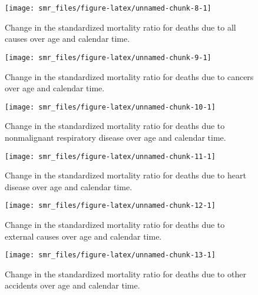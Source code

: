 \documentclass[]{article}
\begin{document}
\begin{figure}[H]

{\centering \texttt{[image: smr\_files/figure-latex/unnamed-chunk-8-1]} 

}

\caption{Change in the standardized mortality ratio for deaths due to all causes over age and calendar time.}\label{fig:unnamed-chunk-8}
\end{figure}

\begin{figure}[H]

{\centering \texttt{[image: smr\_files/figure-latex/unnamed-chunk-9-1]} 

}

\caption{Change in the standardized mortality ratio for deaths due to cancers over age and calendar time.}\label{fig:unnamed-chunk-9}
\end{figure}

\begin{figure}[H]

{\centering \texttt{[image: smr\_files/figure-latex/unnamed-chunk-10-1]} 

}

\caption{Change in the standardized mortality ratio for deaths due to nonmalignant respiratory disease over age and calendar time.}\label{fig:unnamed-chunk-10}
\end{figure}

\begin{figure}[H]

{\centering \texttt{[image: smr\_files/figure-latex/unnamed-chunk-11-1]} 

}

\caption{Change in the standardized mortality ratio for deaths due to heart disease over age and calendar time.}\label{fig:unnamed-chunk-11}
\end{figure}

\begin{figure}[H]

{\centering \texttt{[image: smr\_files/figure-latex/unnamed-chunk-12-1]} 

}

\caption{Change in the standardized mortality ratio for deaths due to external causes over age and calendar time.}\label{fig:unnamed-chunk-12}
\end{figure}

\begin{figure}[H]

{\centering \texttt{[image: smr\_files/figure-latex/unnamed-chunk-13-1]} 

}

\caption{Change in the standardized mortality ratio for deaths due to other accidents over age and calendar time.}\label{fig:unnamed-chunk-13}
\end{figure}
\end{document}
